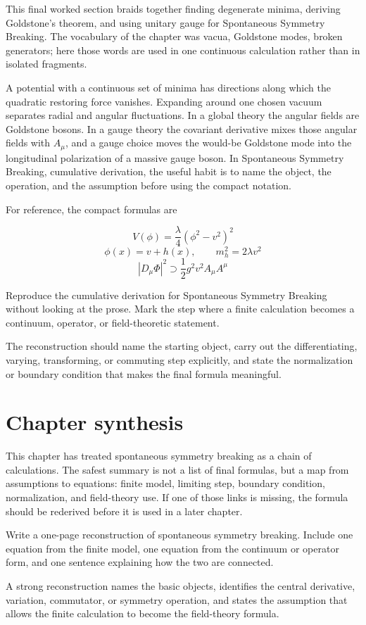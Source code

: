 This final worked section braids together finding degenerate minima, deriving Goldstone's theorem, and using unitary gauge for Spontaneous Symmetry Breaking.  The vocabulary of the chapter was vacua, Goldstone modes, broken generators; here those words are used in one continuous calculation rather than in isolated fragments.

A potential with a continuous set of minima has directions along which the quadratic restoring force vanishes.  Expanding around one chosen vacuum separates radial and angular fluctuations.  In a global theory the angular fields are Goldstone bosons.  In a gauge theory the covariant derivative mixes those angular fields with \(A_\mu\), and a gauge choice moves the would-be Goldstone mode into the longitudinal polarization of a massive gauge boson.  In Spontaneous Symmetry Breaking, cumulative derivation, the useful habit is to name the object, the operation, and the assumption before using the compact notation.

For reference, the compact formulas are

\[
  V(\phi)=\frac{\lambda}{4}(\phi^2-v^2)^2
\]
\[
  \phi(x)=v+h(x),\qquad m_h^2=2\lambda v^2
\]
\[
  |D_\mu\Phi|^2\supset \frac12g^2v^2A_\mu A^\mu
\]

\begin{exercise}
Reproduce the cumulative derivation for Spontaneous Symmetry Breaking without looking at the prose.  Mark the step where a finite calculation becomes a continuum, operator, or field-theoretic statement.
\begin{answer}
The reconstruction should name the starting object, carry out the differentiating, varying, transforming, or commuting step explicitly, and state the normalization or boundary condition that makes the final formula meaningful.
\end{answer}
\end{exercise}



\section{Chapter synthesis}

This chapter has treated spontaneous symmetry breaking as a chain of calculations.  The safest summary is not a list of final formulas, but a map from assumptions to equations: finite model, limiting step, boundary condition, normalization, and field-theory use.  If one of those links is missing, the formula should be rederived before it is used in a later chapter.

\begin{exercise}
Write a one-page reconstruction of spontaneous symmetry breaking.  Include one equation from the finite model, one equation from the continuum or operator form, and one sentence explaining how the two are connected.
\begin{answer}
A strong reconstruction names the basic objects, identifies the central derivative, variation, commutator, or symmetry operation, and states the assumption that allows the finite calculation to become the field-theory formula.
\end{answer}
\end{exercise}
